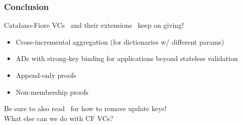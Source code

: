 \begin{frame}
    \frametitle{Conclusion}
    Catalano-Fiore VCs~\cite{CF13} and their extensions~\cite{LM19,CFG+20} keep on giving!\pause\\
    \begin{itemize}
        \item Cross-incremental aggregation (for dictionaries w/ different params)\pause\\
        \item ADs with strong-key binding for applications beyond stateless validation\pause\\
        \item Append-only proofs\pause\\
        \item Non-membership proofs\pause\\
    \end{itemize}
    Be sure to also read~\cite{AR20} for how to remove update keys!\pause\\
    \vspace{1em}
    What else can we do with CF VCs?
\end{frame}